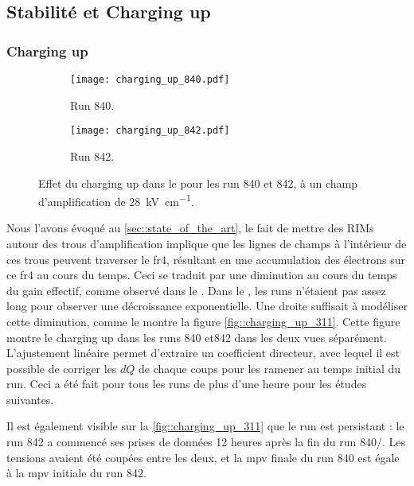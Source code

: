     \subsection{Stabilité et Charging up}\label{sec::res-stab-cu}

      \subsubsection{Charging up}

        \begin{figure}[htbp]
        \centering
          \begin{subfigure}[t]{0.5\textwidth}
            \centering
            \texttt{[image: charging\_up\_840.pdf]}
            \caption[]{Run 840.}
          \end{subfigure}\hfill
          \begin{subfigure}[t]{0.5\textwidth}
            \centering
            \texttt{[image: charging\_up\_842.pdf]}
            \caption[]{Run 842.}
          \end{subfigure}
          \caption[Effet du charging up dans le \TOO{}.]{\label{fig::charging_up_311}Effet du charging up dans le \TOO{} pour les run 840 et 842, à un champ d'amplification de \SI{28}{\kilo\volt\per\centi\meter}.}
        \end{figure}
        
        Nous l'avons évoqué au \autoref{sec::state_of_the_art}, le fait de mettre des RIMs autour des trous d'amplification implique que les lignes de champs à l'intérieur de ces trous peuvent traverser le \gls{fr4}, résultant en une accumulation des électrons sur ce \gls{fr4} au cours du temps. Ceci se traduit par une diminution au cours du temps du gain effectif, comme observé dans le \threeL{}\cite{Cantini2014}. Dans le \TOO{}, les runs n'étaient pas assez long pour observer une décroissance exponentielle. Une droite suffisait à modéliser cette diminution, comme le montre la figure \autoref{fig::charging_up_311}. Cette figure montre le charging up dans les runs 840 et842 dans les deux vues séparément. L'ajustement linéaire permet d'extraire un coefficient directeur, avec lequel il est possible de corriger les $dQ$ de chaque coups pour les ramener au temps initial du run. Ceci a été fait pour tous les runs de plus d'une heure pour les études suivantes. 

        Il est également visible sur la \autoref{fig::charging_up_311} que le run est persistant : le run 842 a commencé ses prises de données 12 heures après la fin du run 840/. Les tensions avaient été coupées entre les deux, et la \gls{mpv} finale du run 840 est égale à la \gls{mpv} initiale du run 842.

